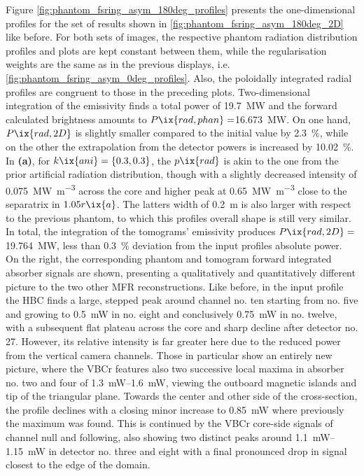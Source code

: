                 Figure \ref{fig:phantom_fsring_asym_180deg_profiles} presents the one-dimensional profiles for the set of results shown in \cref{fig:phantom_fsring_asym_180deg_2D} like before. For both sets of images, the respective phantom radiation distribution profiles and plots are kept constant between them, while the regularisation weights are the same as in the previous displays, i.e. \cref{fig:phantom_fsring_asym_0deg_profiles}. Also, the poloidally integrated radial profiles are congruent to those in the preceding plots. Two-dimensional integration of the emissivity finds a total power of \SI{19.7}{\mega\watt} and the forward calculated brightness amounts to $P\ix{rad,phan}=$\SI{16.673}{\mega\watt}. On one hand, $P\ix{rad,2D}$ is slightly smaller compared to the initial value by \SI{2.3}{\percent}, while on the other the extrapolation from the detector powers is increased by \SI{10.02}{\percent}. In \textbf{(a)}, for $k\ix{ani}=\left\{0.3, 0.3\right\}$, the $p\ix{rad}$ is akin to the one from the prior artificial radiation distribution, though with a slightly decreased intensity of \SI{0.075}{\mega\watt\per\cubic\meter} across the core and higher peak at \SI{0.65}{\mega\watt\per\cubic\meter} close to the separatrix in $1.05r\ix{a}$. The latters width of \SI{0.2}{\meter} is also larger with respect to the previous phantom, to which this profiles overall shape is still very similar. In total, the integration of the tomograms' emissivity produces $P\ix{rad,2D}=$\SI{19.764}{\mega\watt}, less than \SI{0.3}{\percent} deviation from the input profiles absolute power.\\%
                On the right, the corresponding phantom and tomogram forward integrated absorber signals are shown, presenting a qualitatively and quantitatively different picture to the two other MFR reconstructions. Like before, in the input profile the HBC finds a large, stepped peak around channel no. ten starting from no. five and growing to \SI{0.5}{\milli\watt} in no. eight and conclusively \SI{0.75}{\milli\watt} in no. twelve, with a subsequent flat plateau across the core and sharp decline after detector no. 27. However, its relative intensity is far greater here due to the reduced power from the vertical camera channels. Those in particular show an entirely new picture, where the VBCr features also two successive local maxima in absorber no. two and four of \SIrange{1.3}{1.6}{\milli\watt}, viewing the outboard magnetic islands and tip of the triangular plane. Towards the center and other side of the cross-section, the profile declines with a closing minor increase to \SI{0.85}{\milli\watt} where previously the maximum was found. This is continued by the VBCr core-side signals of channel null and following, also showing two distinct peaks around \SIrange{1.1}{1.15}{\milli\watt} in detector no. three and eight with a final pronounced drop in signal closest to the edge of the domain.\\%
